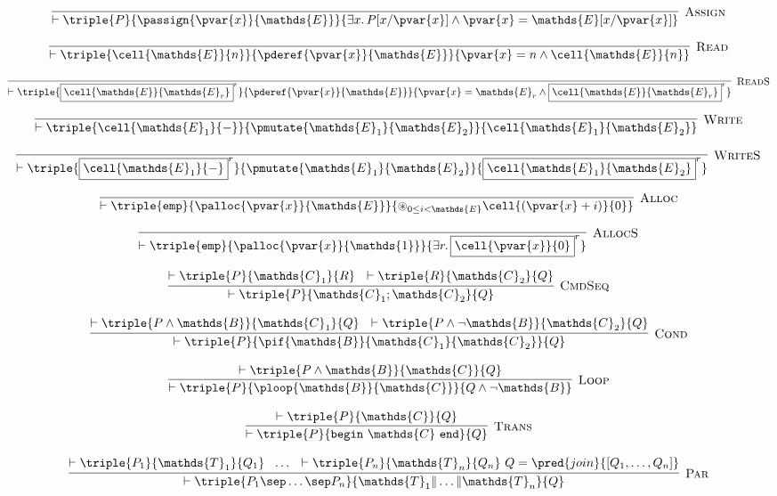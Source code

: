 \[
\infer[\textsc{Assign}]
{
	\vdash \triple
	{P}
	{\passign{\pvar{x}}{\mathds{E}}}
	{\exists x\ldotp P[x/\pvar{x}] \land \pvar{x} = \mathds{E}[x/\pvar{x}]}
}
{}
\]

\[
\infer[\textsc{Read}]
{
	\vdash \triple
	{\cell{\mathds{E}}{n}}
	{\pderef{\pvar{x}}{\mathds{E}}}
	{\pvar{x} = n \land \cell{\mathds{E}}{n}}
}
{}
\]

\[
\infer[\textsc{ReadS}]
{
	\vdash \triple
	{\boxed{\cell{\mathds{E}}{\mathds{E}_r}}^r}
	{\pderef{\pvar{x}}{\mathds{E}}}
	{\pvar{x} = \mathds{E}_r \land \boxed{\cell{\mathds{E}}{\mathds{E}_r}}^r}
}
{}
\]

\[
\infer[\textsc{Write}]
{
	\vdash \triple
	{\cell{\mathds{E}_1}{-}}
	{\pmutate{\mathds{E}_1}{\mathds{E}_2}}
	{\cell{\mathds{E}_1}{\mathds{E}_2}}
}
{}
\]

\[
\infer[\textsc{WriteS}]
{
	\vdash \triple
	{\boxed{\cell{\mathds{E}_1}{-}}^r}
	{\pmutate{\mathds{E}_1}{\mathds{E}_2}}
	{\boxed{\cell{\mathds{E}_1}{\mathds{E}_2}}^r}
}
{}
\]

\[
\infer[\textsc{Alloc}]
{
	\vdash \triple
	{\mathtt{emp}}
	{\palloc{\pvar{x}}{\mathds{E}}}
	{\circledast_{0 \leq i < \mathds{E}}\cell{(\pvar{x} + i)}{0}}
}
{}
\]

\[
\infer[\textsc{AllocS}]
{
	\vdash \triple
	{\mathtt{emp}}
	{\palloc{\pvar{x}}{\mathds{1}}}
	{\exists r \ldotp \boxed{\cell{\pvar{x}}{0}}^r}
}
{}
\]

\[
\infer[\textsc{CmdSeq}]
{
	\vdash \triple
	{P}
	{\mathds{C}_1; \mathds{C}_2}
	{Q}
}
{
	\vdash \triple
	{P}
	{\mathds{C}_1}
	{R}\ \
	\vdash \triple
	{R}
	{\mathds{C}_2}
	{Q}
}
\]

\[
\infer[\textsc{Cond}]
{
	\vdash \triple
	{P}
	{\pif{\mathds{B}}{\mathds{C}_1}{\mathds{C}_2}}
	{Q}
}
{
	\vdash \triple
	{P \land \mathds{B}}
	{\mathds{C}_1}
	{Q}\ \
	\vdash \triple
	{P \land \lnot \mathds{B}}
	{\mathds{C}_2}
	{Q}
}
\]

\[
\infer[\textsc{Loop}]
{
	\vdash \triple
	{P}
	{\ploop{\mathds{B}}{\mathds{C}}}
	{Q \land \lnot \mathds{B}}
}
{
	\vdash \triple
	{P \land \mathds{B}}
	{\mathds{C}}
	{Q}
}
\]

\[
\infer[\textsc{Trans}]
{
	\vdash \triple
	{P}
	{\mathtt{begin}\ \mathds{C}\ \mathtt{end}}
	{Q}
}
{
	\vdash \triple
	{P}
	{\mathds{C}}
	{Q}
}
\]

\[
\infer[\textsc{Par}]
{
	\vdash \triple
	{P_1 \sep \ldots \sep P_n}
	{\mathds{T}_1 \| \ldots \| \mathds{T}_n}
	{Q}
}
{
	\vdash \triple
	{P_1}
	{\mathds{T}_1}
	{Q_1}\ \
	\ldots\ \
	\vdash \triple
	{P_n}
	{\mathds{T}_n}
	{Q_n}\
	Q = \pred{join}{[Q_1, \ldots, Q_n]}
}
\]

